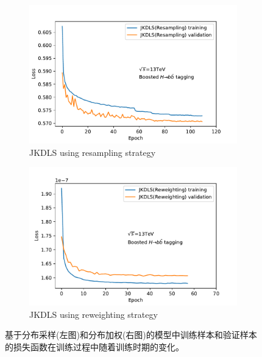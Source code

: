 \begin{figure}[htbp]
  \begin{subfigure}{.5\textwidth}
  \centering
   \includegraphics[width=0.99\textwidth]{figuresXbb/Reweight/LOSSResample.pdf}
   \caption{JKDLS using resampling strategy}
  \end{subfigure}
  \begin{subfigure}{.5\textwidth}
  \centering
   \includegraphics[width=0.99\textwidth]{figuresXbb/Reweight/LOSSReweight.pdf}
   \caption{JKDLS using reweighting strategy}
  \end{subfigure}
  \caption{ 
 基于分布采样(左图)和分布加权(右图)的模型中训练样本和验证样本的损失函数在训练过程中随着训练时期的变化。
   }
  \label{fig:WEILOSS}
\end{figure} 



